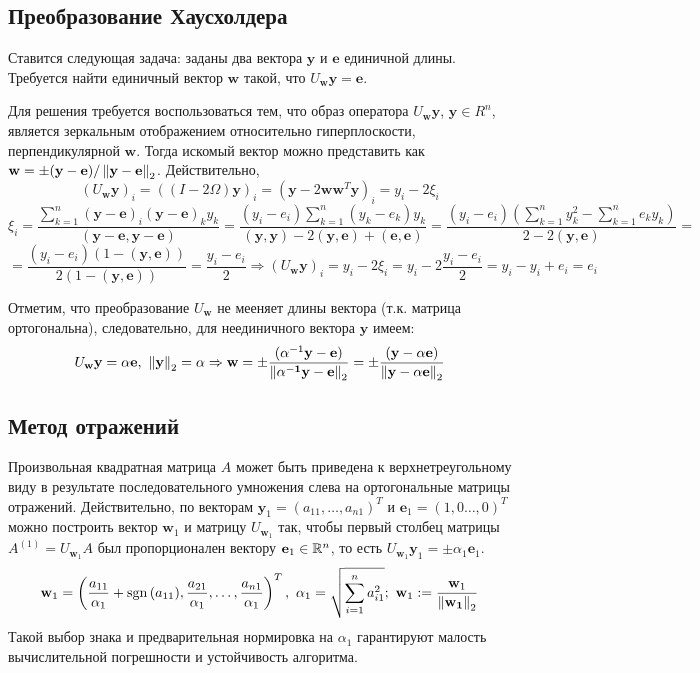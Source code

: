 \subsection*{Преобразование Хаусхолдера}

Ставится следующая задача: заданы два вектора $\mathbf{y}$ и $\mathbf{e}$
единичной длины. Требуется найти единичный вектор $\mathbf{w}$ такой, что
$U_\mathbf{w}\mathbf{y}=\mathbf{e}$.

Для решения требуется воспользоваться тем, что образ оператора $U_\mathbf{w}\mathbf{y}$, $\mathbf{y}\in R^n$,
является зеркальным отображением относительно гиперплоскости, перпендикулярной
$\mathbf{w}$. Тогда искомый вектор можно представить как
$\mathbf{w}=\pm(\mathbf{y}-\mathbf{e})/\left\lVert\mathbf{\mathbf{y}-\mathbf{e}}\right\rVert_{2}$.
Действительно,
\[(U_\mathbf{w}\mathbf{y})_i=((I-2\Omega)\mathbf{y})_i=(\mathbf{y}-2\mathbf{w}\mathbf{w}^T\mathbf{y})_i=y_i-2\xi_i\]
\[\xi_i=\frac{\sum_{k=1}^n(\mathbf{y}-\mathbf{e})_i(\mathbf{y}-\mathbf{e})_ky_k}{(\mathbf{y}-\mathbf{e},\mathbf{y}-\mathbf{e})}=\frac{(y_i-e_i)\sum_{k=1}^n(y_k-e_k)y_k}{(\mathbf{y}, \mathbf{y})-2(\mathbf{y}, \mathbf{e})+(\mathbf{e}, \mathbf{e})}=\frac{(y_i-e_i)\left(\sum_{k=1}^ny_k^2-\sum_{k=1}^ne_ky_k\right)}{2-2(\mathbf{y}, \mathbf{e})}=\]
\[=\frac{(y_i-e_i)\left(1-(\mathbf{y}, \mathbf{e})\right)}{2(1-(\mathbf{y}, \mathbf{e}))}=\frac{y_i-e_i}{2}\Rightarrow
  (U_\mathbf{w}\mathbf{y})_i=y_i-2\xi_i=y_i-2\frac{y_i-e_i}{2}=y_i-y_i+e_i=e_i\]

Отметим, что преобразование $U_\mathbf{w}$ не мееняет длины вектора (т.к. матрица ортогональна),
следовательно, для неединичного вектора $\mathbf{y}$ имеем:
\[U_\mathbf{w}\mathbf{y}=\alpha\mathbf{e},\ \norm{\mathbf{y}}_2=\alpha\Rightarrow\mathbf{w}=\pm\frac{(\alpha^{-1}\mathbf{y}-\mathbf{e})}{\norml{\alpha^{-1}\mathbf{y}-\mathbf{e}}{2}}=\pm\frac{(\mathbf{y}-\alpha\mathbf{e})}{\norml{\mathbf{y}-\alpha\mathbf{e}}{2}}\]

\subsection*{Метод отражений}

Произвольная квадратная матрица $A$ может быть
приведена к верхнетреугольному виду в результате последовательного умножения
слева на ортогональные матрицы отражений. Действительно, по векторам
$\mathbf{y}_1=(a_{11},\ldots,a_{n1})^T$ и $\mathbf{e}_1=(1,0\ldots,0)^T$ можно построить вектор
$\mathbf{w}_1$ и матрицу $U_{\mathbf{w}_1}$ так, чтобы первый столбец матрицы
$A^{(1)}=U_{\mathbf{w}_1}A$ был пропорционален вектору $\mathbf{e}_1\in\mathbb{R}^n$, то есть
$U_{\mathbf{w}_1}\mathbf{y}_1=\pm\alpha_1\mathbf{e}_1$.
\[\mathbf{w}_1=\left(\frac{a_{11}}{\alpha_1} + \sgn{(a_{11})}, \frac{a_{21}}{\alpha_1},\ldots,\frac{a_{n1}}{\alpha_1}\right)^T,\ \alpha_1 =\sqrt{\sum_{i=1}^na_{i1}^2};\ \mathbf{w}_1 := \frac{\mathbf{w}_1}{\norml{\mathbf{w}_1}{2}}\]
Такой выбор знака и предварительная нормировка на $\alpha_1$ гарантируют малость
вычислительной погрешности и устойчивость алгоритма.

